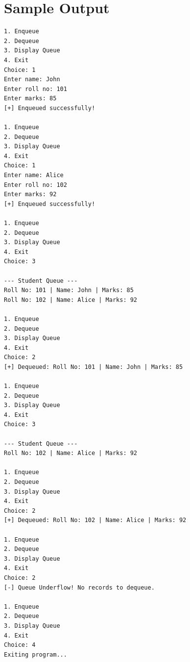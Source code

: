 \documentclass[11pt,a4paper]{article}
\begin{document}
\section*{Sample Output}
\begin{lstlisting}[style=terminalstyle]
1. Enqueue
2. Dequeue
3. Display Queue
4. Exit
Choice: 1
Enter name: John
Enter roll no: 101
Enter marks: 85
[+] Enqueued successfully!

1. Enqueue
2. Dequeue
3. Display Queue
4. Exit
Choice: 1
Enter name: Alice
Enter roll no: 102
Enter marks: 92
[+] Enqueued successfully!

1. Enqueue
2. Dequeue
3. Display Queue
4. Exit
Choice: 3

--- Student Queue ---
Roll No: 101 | Name: John | Marks: 85
Roll No: 102 | Name: Alice | Marks: 92

1. Enqueue
2. Dequeue
3. Display Queue
4. Exit
Choice: 2
[+] Dequeued: Roll No: 101 | Name: John | Marks: 85

1. Enqueue
2. Dequeue
3. Display Queue
4. Exit
Choice: 3

--- Student Queue ---
Roll No: 102 | Name: Alice | Marks: 92

1. Enqueue
2. Dequeue
3. Display Queue
4. Exit
Choice: 2
[+] Dequeued: Roll No: 102 | Name: Alice | Marks: 92

1. Enqueue
2. Dequeue
3. Display Queue
4. Exit
Choice: 2
[-] Queue Underflow! No records to dequeue.

1. Enqueue
2. Dequeue
3. Display Queue
4. Exit
Choice: 4
Exiting program...
\end{lstlisting}
\end{document}
